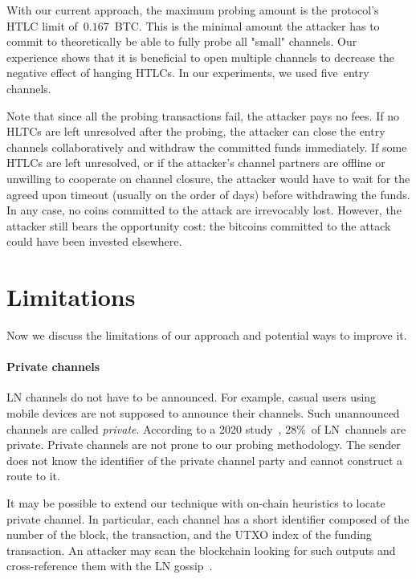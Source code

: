 With our current approach, the maximum probing amount is the protocol's HTLC limit of~$0.167$~BTC\@.
This is the minimal amount the attacker has to commit to theoretically be able to fully probe all "small" channels.
Our experience shows that it is beneficial to open multiple channels to decrease the negative effect of hanging HTLCs.
In our experiments, we used five~entry channels.

Note that since all the probing transactions fail, the attacker pays no fees.
If no HLTCs are left unresolved after the probing, the attacker can close the entry channels collaboratively and withdraw the committed funds immediately.
If some HTLCs are left unresolved, or if the attacker's channel partners are offline or unwilling to cooperate on channel closure, the attacker would have to wait for the agreed upon timeout (usually on the order of days) before withdrawing the funds.
In any case, no coins committed to the attack are irrevocably lost.
However, the attacker still bears the opportunity cost: the bitcoins committed to the attack could have been invested elsewhere.


\section{Limitations}

Now we discuss the limitations of our approach and potential ways to improve it.

\paragraph{Private channels}

LN channels do not have to be announced.
For example, casual users using mobile devices are not supposed to announce their channels.
Such unannounced channels are called \textit{private}.
According to a 2020 study~\cite{BitMEXPrivateChannels}, $28\%$~of LN~channels are private.
Private channels are not prone to our probing methodology.
The sender does not know the identifier of the private channel party and cannot construct a route to it.

It may be possible to extend our technique with on-chain heuristics to locate private channel.
In particular, each channel has a short identifier composed of the number of the block, the transaction, and the UTXO index of the funding transaction.
An attacker may scan the blockchain looking for such outputs and cross-reference them with the LN gossip~\cite{Pickhardt2020}.

